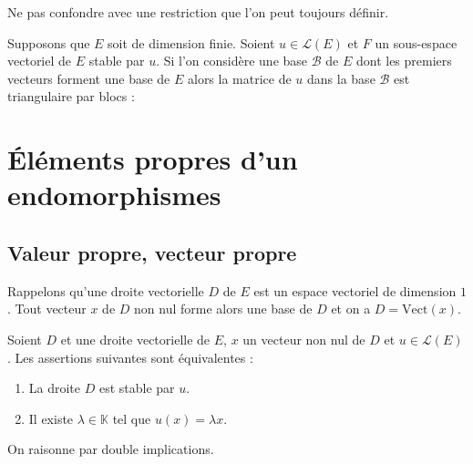 \documentclass[a4paper,10pt]{report}
\begin{document}
\begin{att} Ne pas confondre avec une restriction que l'on peut toujours définir.
\end{att}

\medskip

\begin{rem} Supposons que $E$ soit de dimension finie. Soient $u \in \mathcal{L}(E)$ et $F$ un sous-espace vectoriel de $E$ stable par $u$. Si l'on considère une base $\mathcal{B}$ de $E$ dont les premiers vecteurs forment une base de $E$ alors la matrice de $u$ dans la base $\mathcal{B}$ est triangulaire par blocs :

\vspace{8cm}
\end{rem}




\section{Éléments propres d'un endomorphismes}

\subsection{Valeur propre, vecteur propre} 

\noindent Rappelons qu'une droite vectorielle $D$ de $E$ est un espace vectoriel de dimension $1$. Tout vecteur $x$ de $D$ non nul forme alors une base de $D$ et on a $D= \textrm{Vect}(x)$.

\medskip

\begin{prop}\label{Stable} Soient $D$ et une droite vectorielle de $E$, $x$ un vecteur non nul de $D$ et $u \in \mathcal{L}(E)$. Les assertions suivantes sont équivalentes :

\begin{enumerate}
\item La droite $D$ est stable par $u$.
\item Il existe $\lambda \in \mathbb{K}$ tel que $u(x)= \lambda x$.
\end{enumerate}
\end{prop}

\begin{preuve} On raisonne par double implications.

\vspace{7cm}
%
%
%
\end{preuve}
\end{document}
